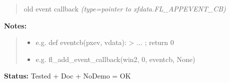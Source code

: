 \begin{boxedminipage}{\funcwidth}
      \begin{quote}

old event callback
      {\it (type=pointer to xfdata.FL\_APPEVENT\_CB)}

      \end{quote}

\textbf{Notes:}
\begin{quote}
  \begin{itemize}

  \item
    \setlength{\parskip}{0.6ex}

e.g. def eventcb(pxev, vdata): > ... ; return 0


  \item 
e.g. fl\_add\_event\_callback(win2, 0, eventcb, None)


\end{itemize}

\end{quote}

\textbf{Status:} 
Tested + Doc + NoDemo = OK


    \end{boxedminipage}

    \label{xformslib:flxbasic:fl_remove_event_callback}

    \vspace{0.5ex}

